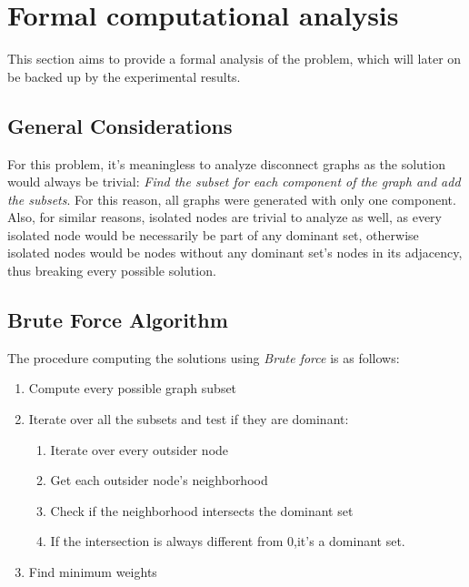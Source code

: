 \documentclass[mirror,times]{revdetua}
\begin{document}
\section{Formal computational analysis}

This section aims to provide a formal analysis of the problem, which will later
on be backed up by the experimental results.
\subsection{General Considerations}

For this problem, it's meaningless to analyze disconnect graphs as the
solution would always be trivial:\textit{ Find the subset for each component of
the graph and add the subsets}. For this reason, all graphs were generated
with only one component.\\
Also, for similar reasons, isolated nodes are trivial to analyze as well, as
every isolated node would be necessarily be part of any dominant set, otherwise
isolated nodes would be nodes without any dominant set's nodes in its adjacency,
thus breaking every possible solution.

\subsection{Brute Force Algorithm}

The procedure computing the solutions using \textit{Brute force} is as follows:\begin{enumerate}
  \item Compute every possible graph subset
  \item Iterate over all the subsets and test if they are dominant:\begin{enumerate}
    \item Iterate over every outsider node\footnotemark
    \item Get each outsider node's neighborhood
    \item Check if the neighborhood intersects the dominant set
    \item If the intersection is always different from 0,it's a dominant set.
  \end{enumerate}
  \item Find minimum weights
\end{enumerate}
\end{document}
